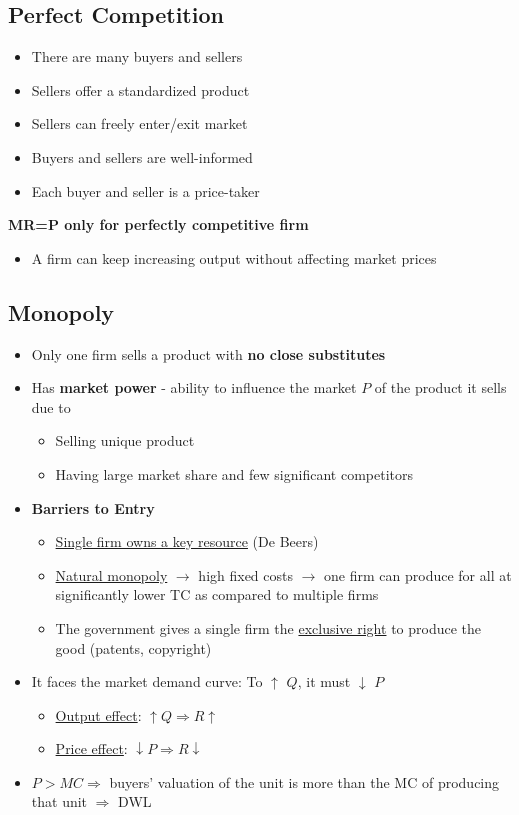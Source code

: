 \documentclass{article}
\begin{document}
\begin{multicols}{2}
\subsection{Perfect Competition}
\begin{itemize}
	\item There are many buyers and sellers
	\item Sellers offer a standardized product
	\item Sellers can freely enter/exit market
	\item Buyers and sellers are well-informed
	\item Each buyer and seller is a price-taker
\end{itemize}
\textbf{MR=P only for perfectly competitive firm}
\begin{itemize}
	\item A firm can keep increasing output without affecting market prices
\end{itemize}

\subsection{Monopoly}
\begin{itemize}
	\item Only one firm sells a product with \textbf{no close substitutes}
	\item Has \textbf{market power} - ability to influence the market $P$ of the product it sells due to
	\begin{itemize}
		\item Selling unique product
		\item Having large market share and few significant competitors
	\end{itemize}
	\item \textbf{Barriers to Entry}
	\begin{itemize}
		\item \underline{Single firm owns a key resource} (De Beers)
		\item \underline{Natural monopoly} $\rightarrow$ high fixed costs $\rightarrow$ one firm can produce for all at significantly lower TC as compared to multiple firms
		\item The government gives a single firm the \underline{exclusive right} to produce the good (patents, copyright)
	\end{itemize}
    \item It faces the market demand curve: To $\uparrow$ $Q$, it must $\downarrow$ $P$
    \begin{itemize}
    	\item \underline{Output effect}: $\uparrow Q \Rightarrow R\uparrow$
    	\item \underline{Price effect}: $\downarrow P \Rightarrow R\downarrow$
    \end{itemize}
    \item $P > MC \Rightarrow$ buyers' valuation of the unit is more than the MC of producing that unit $\Rightarrow$ DWL
\end{itemize}

\end{multicols}
\end{document}
